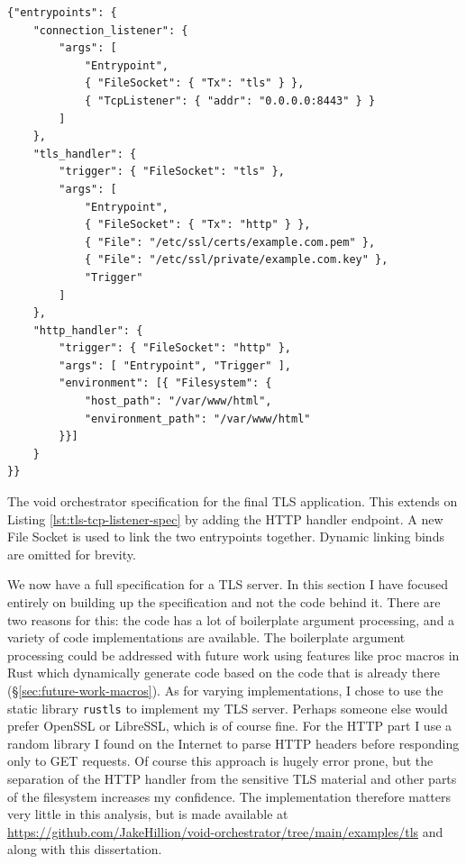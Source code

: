 \documentclass[12pt,a4paper,twoside]{report}
\begin{document}
\begin{listing}
\begin{verbatim}
{"entrypoints": {
    "connection_listener": {
        "args": [
            "Entrypoint",
            { "FileSocket": { "Tx": "tls" } },
            { "TcpListener": { "addr": "0.0.0.0:8443" } }
        ]
    },
    "tls_handler": {
        "trigger": { "FileSocket": "tls" },
        "args": [
            "Entrypoint",
            { "FileSocket": { "Tx": "http" } },
            { "File": "/etc/ssl/certs/example.com.pem" },
            { "File": "/etc/ssl/private/example.com.key" },
            "Trigger"
        ]
    },
    "http_handler": {
        "trigger": { "FileSocket": "http" },
        "args": [ "Entrypoint", "Trigger" ],
        "environment": [{ "Filesystem": {
            "host_path": "/var/www/html",
            "environment_path": "/var/www/html"
        }}]
    }
}}
\end{verbatim}

\caption{The void orchestrator specification for the final TLS application. This extends on Listing \ref{lst:tls-tcp-listener-spec} by adding the HTTP handler endpoint. A new File Socket is used to link the two entrypoints together. Dynamic linking binds are omitted for brevity.}
\label{lst:tls-spec}
\end{listing}

We now have a full specification for a TLS server. In this section I have focused entirely on building up the specification and not the code behind it. There are two reasons for this: the code has a lot of boilerplate argument processing, and a variety of code implementations are available. The boilerplate argument processing could be addressed with future work using features like proc macros in Rust which dynamically generate code based on the code that is already there (§\ref{sec:future-work-macros}). As for varying implementations, I chose to use the static library \texttt{rustls} to implement my TLS server. Perhaps someone else would prefer OpenSSL or LibreSSL, which is of course fine. For the HTTP part I use a random library I found on the Internet to parse HTTP headers before responding only to GET requests. Of course this approach is hugely error prone, but the separation of the HTTP handler from the sensitive TLS material and other parts of the filesystem increases my confidence. The implementation therefore matters very little in this analysis, but is made available at \url{https://github.com/JakeHillion/void-orchestrator/tree/main/examples/tls} and along with this dissertation.
\end{document}
